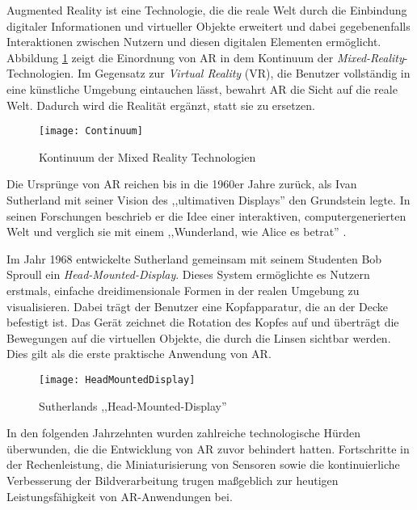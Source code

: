 Augmented Reality ist eine Technologie, die die reale Welt durch die Einbindung digitaler Informationen und virtueller Objekte erweitert und dabei gegebenenfalls Interaktionen zwischen Nutzern und diesen digitalen Elementen ermöglicht. Abbildung \ref{fig:Continuum} zeigt die Einordnung von AR in dem Kontinuum der \emph{Mixed-Reality}-Technologien. Im Gegensatz zur \emph{Virtual Reality} (VR), die Benutzer vollständig in eine künstliche Umgebung eintauchen lässt, bewahrt AR die Sicht auf die reale Welt. Dadurch wird die Realität ergänzt, statt sie zu ersetzen. \cite{azuma1997ar, doerner2022virtual}

\begin{figure}
    \centering
    \texttt{[image: Continuum]}
    \caption{Kontinuum der Mixed Reality Technologien \cite{doerner2022virtual}\label{fig:Continuum}}\par
\end{figure}

Die Ursprünge von AR reichen bis in die 1960er Jahre zurück, als Ivan Sutherland mit seiner Vision des ,,ultimativen Displays'' \cite{sutherland1965ultimateDisplay} den Grundstein legte. In seinen Forschungen beschrieb er die Idee einer interaktiven, computergenerierten Welt und verglich sie mit einem ,,Wunderland, wie Alice es betrat'' \cite{sutherland1965ultimateDisplay}. 

Im Jahr 1968 entwickelte Sutherland gemeinsam mit seinem Studenten Bob Sproull ein \emph{Head-Mounted-Display}. Dieses System ermöglichte es Nutzern erstmals, einfache dreidimensionale Formen in der realen Umgebung zu visualisieren. Dabei trägt der Benutzer eine Kopfapparatur, die an der Decke befestigt ist. Das Gerät zeichnet die Rotation des Kopfes auf und überträgt die Bewegungen auf die virtuellen Objekte, die durch die Linsen sichtbar werden. Dies gilt als die erste praktische Anwendung von AR. \cite{sutherland19683dDisplay, doerner2022virtual}

\begin{figure}
    \centering
    \texttt{[image: HeadMountedDisplay]}
    \caption{Sutherlands ,,Head-Mounted-Display'' \cite{sutherland1965ultimateDisplay}\label{fig:HeadMountedDisplay}}\par
\end{figure}

In den folgenden Jahrzehnten wurden zahlreiche technologische Hürden überwunden, die die Entwicklung von AR zuvor behindert hatten. Fortschritte in der Rechenleistung, die Miniaturisierung von Sensoren sowie die kontinuierliche Verbesserung der Bildverarbeitung trugen maßgeblich zur heutigen Leistungsfähigkeit von AR-Anwendungen bei. \cite{doerner2022virtual}

